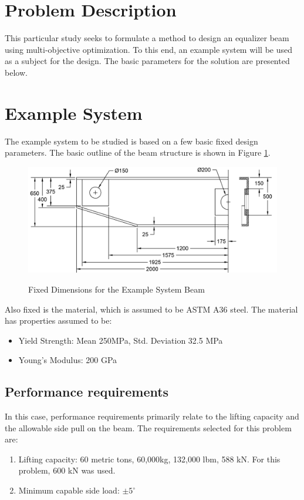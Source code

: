 \section{Problem Description}
This particular study seeks to formulate a method to design an equalizer beam using multi-objective optimization. To this end, an example system will be used as a subject for the design. The basic parameters for the solution are presented below. 

\section{Example System}
The example system to be studied is based on a few basic fixed design parameters. The basic outline of the beam structure is shown in Figure \ref{img:dim_beam}. 

\begin{figure}
\includegraphics[width=\textwidth]{img/dim_beam.png}
	\label{img:dim_beam}
	\caption{Fixed Dimensions for the Example System Beam}
\end{figure}

Also fixed is the material, which is assumed to be ASTM A36 steel. The material has properties assumed to be: 

\begin{itemize}
\item Yield Strength: Mean 250MPa, Std. Deviation 32.5 MPa
\item Young's Modulus: 200 GPa
\end{itemize}

\subsection{Performance requirements}
In this case, performance requirements primarily relate to the lifting capacity and the allowable side pull on the beam. The requirements selected for this problem are: 
\begin{enumerate}
\item Lifting capacity: 60 metric tons, 60,000kg, 132,000 lbm, 588 kN. For this problem, 600 kN was used. 
\item Minimum capable side load: $\pm 5^{\circ} $
\end{enumerate}

